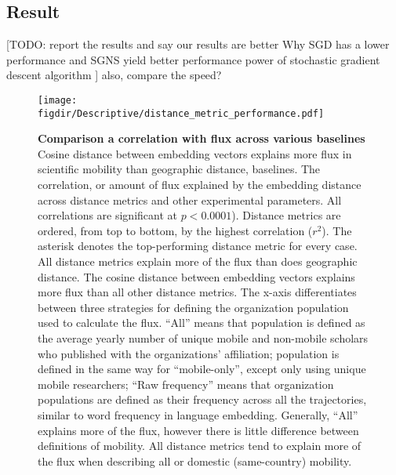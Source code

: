 \documentclass[12pt,a4paper]{article}
\def\figdir{../Figs}
\newcommand{\todo}[1]{{\leavevmode\color{orange}[TODO: #1]}}
\newcommand{\mycaption}[2]{%
  \caption[#1]{\textbf{#1} \small#2}%
}
\begin{document}
\subsection{Result}
\todo{report the results and say our results are better
Why SGD has a lower performance and SGNS yield better performance
power of stochastic gradient descent algorithm \autocite{smith2020generalization}}
also, compare the speed?





\clearpage
%
%
\begin{figure}[p!]
	\centering
	\texttt{[image: \\figdir/Descriptive/distance\_metric\_performance.pdf]}
		\mycaption
		{Comparison a correlation with flux across various baselines}
		{
		Cosine distance between embedding vectors explains more flux in scientific mobility than geographic distance, baselines.
		The correlation, or amount of flux explained by the embedding distance across distance metrics and other experimental parameters. 
		All correlations are significant at $p < 0.0001$). 
		Distance metrics are ordered, from top to bottom, by the highest correlation ($r^{2}$). 
		The asterisk denotes the top-performing distance metric for every case. 
		All distance metrics explain more of the flux than does geographic distance.
		The cosine distance between embedding vectors explains more flux than all other distance metrics. 
		The x-axis differentiates between three strategies for defining the organization population used to calculate the flux. 
		``All'' means that population is defined as the average yearly number of unique mobile and non-mobile scholars who published with the organizations' affiliation;
		population is defined in the same way for ``mobile-only'', except only using unique mobile researchers;
		``Raw frequency'' means that organization populations are defined as their frequency across all the trajectories, similar to word frequency in language embedding. 
		Generally, ``All'' explains more of the flux, however there is little difference between definitions of mobility.
		All distance metrics tend to explain more of the flux when describing all or domestic (same-country) mobility.	
		}
	\label{fig:supp:distancemetrics}
\end{figure}
\end{document}
